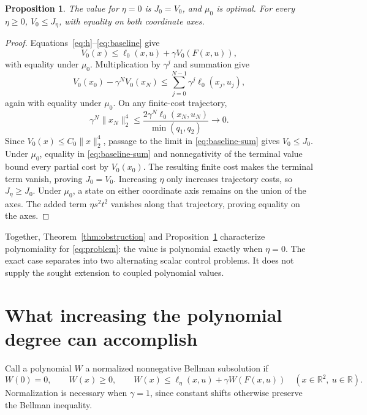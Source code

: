 \documentclass[10pt]{article}
\newtheorem{proposition}{Proposition}
\newcommand{\R}{\mathbb R}
\begin{document}
\begin{proposition}
The value for $\eta=0$ is $J_0=V_0$, and $\mu_0$ is optimal. For every $\eta\geq0$, $V_0\leq J_\eta$, with equality on both coordinate axes.
\label{prop:baseline}
\end{proposition}
\begin{proof}
Equations~\eqref{eq:h}--\eqref{eq:baseline} give
\[
 V_0(x)\leq\ell_0(x,u)+\gamma V_0(F(x,u)),
\]
with equality under $\mu_0$. Multiplication by $\gamma^j$ and summation give
\begin{equation}
 V_0(x_0)-\gamma^NV_0(x_N)
 \leq\sum_{j=0}^{N-1}\gamma^j\ell_0(x_j,u_j),
 \label{eq:baseline-sum}
\end{equation}
again with equality under $\mu_0$. On any finite-cost trajectory,
\[
 \gamma^N\|x_N\|_2^4\leq
 \frac{2\gamma^N\ell_0(x_N,u_N)}{\min(q_1,q_2)}\longrightarrow0.
\]
Since $V_0(x)\leq C_0\|x\|_2^4$, passage to the limit in \eqref{eq:baseline-sum} gives $V_0\leq J_0$. Under $\mu_0$, equality in \eqref{eq:baseline-sum} and nonnegativity of the terminal value bound every partial cost by $V_0(x_0)$. The resulting finite cost makes the terminal term vanish, proving $J_0=V_0$. Increasing $\eta$ only increases trajectory costs, so $J_\eta\geq J_0$. Under $\mu_0$, a state on either coordinate axis remains on the union of the axes. The added term $\eta s^2t^2$ vanishes along that trajectory, proving equality on the axes.
\end{proof}

Together, Theorem~\ref{thm:obstruction} and Proposition~\ref{prop:baseline} characterize polynomiality for \eqref{eq:problem}: the value is polynomial exactly when $\eta=0$. The exact case separates into two alternating scalar control problems. It does not supply the sought extension to coupled polynomial values.

\section{What increasing the polynomial degree can accomplish}

Call a polynomial $W$ a normalized nonnegative Bellman subsolution if
\begin{equation}
 W(0)=0,\qquad W(x)\geq0,\qquad
 W(x)\leq\ell_\eta(x,u)+\gamma W(F(x,u))
 \quad(x\in\R^2,\ u\in\R).
 \label{eq:subsolution}
\end{equation}
Normalization is necessary when $\gamma=1$, since constant shifts otherwise preserve the Bellman inequality.
\end{document}
